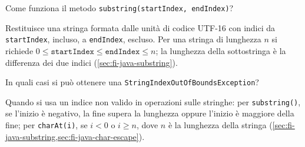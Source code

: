 \begin{exercise}
\label{ex:fi-esercizi-java-collaudo-substring}
Come funziona il metodo \texttt{substring(startIndex, endIndex)}?
\end{exercise}

Restituisce una stringa formata dalle unità di codice UTF-16
con indici da \texttt{startIndex}, incluso, a \texttt{endIndex},
escluso. Per una stringa di lunghezza \(n\) si richiede
\(0\le\texttt{startIndex}\le\texttt{endIndex}\le n\);
la lunghezza della sottostringa è la differenza dei due indici
(\cref{sec:fi-java-substring}).

\begin{exercise}
\label{ex:fi-esercizi-java-collaudo-string-index-exception}
In quali casi si può ottenere una
\texttt{StringIndexOutOfBoundsException}?
\end{exercise}

Quando si usa un indice non valido in operazioni sulle stringhe:
per \texttt{substring()}, se l'inizio è negativo, la fine supera
la lunghezza oppure l'inizio è maggiore della fine; per
\texttt{charAt(i)}, se \(i<0\) o \(i\ge n\), dove \(n\) è la
lunghezza della stringa
(\cref{sec:fi-java-substring,sec:fi-java-char-escape}).
